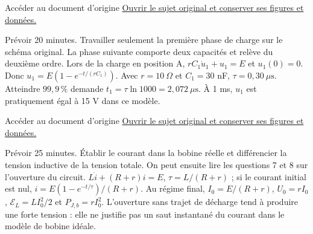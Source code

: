 \begin{loi}{Accéder au document d’origine}
\href{https://mpsi.schleck.ovh/fichiers/devoirs/2025-2026/dm3_elec.pdf}{Ouvrir le sujet original et conserver ses figures et données.}
\end{loi}
Prévoir 20 minutes. Travailler seulement la première phase de charge sur le schéma original. La phase suivante comporte deux capacités et relève du deuxième ordre.
Lors de la charge en position A, $rC_1\dot u_1+u_1=E$ et $u_1(0)=0$. Donc $u_1=E(1-e^{-t/(rC_1)})$. Avec $r=10\ \Omega$ et $C_1=30$ nF, $\tau=0{,}30\ \mu\mathrm{ s}$. Atteindre $99{,}9\,\%$ demande $t_1=\tau\ln1000=2{,}072\ \mu\mathrm{ s}$. À 1 ms, $u_1$ est pratiquement égal à 15 V dans ce modèle.

\begin{loi}{Accéder au document d’origine}
\href{https://mpsi.schleck.ovh/fichiers/devoirs/2025-2026/ds3_elec_chimie.pdf}{Ouvrir le sujet original et conserver ses figures et données.}
\end{loi}
Prévoir 25 minutes. Établir le courant dans la bobine réelle et différencier la tension inductive de la tension totale. On peut ensuite lire les questions 7 et 8 sur l’ouverture du circuit.
$L\dot i+(R+r)i=E$, $\tau=L/(R+r)$ ; si le courant initial est nul, $i=E(1-e^{-t/\tau})/(R+r)$. Au régime final, $I_0=E/(R+r)$, $U_0=rI_0$, $\mathcal E_L=LI_0^2/2$ et $P_{J,b}=rI_0^2$. L’ouverture sans trajet de décharge tend à produire une forte tension : elle ne justifie pas un saut instantané du courant dans le modèle de bobine idéale.

